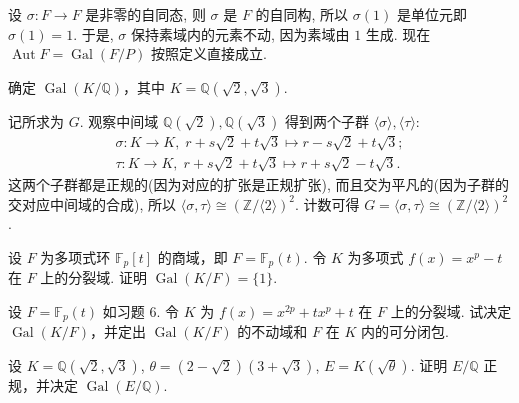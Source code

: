 \begin{solution}
    设 $\sigma\colon F\to F$ 是非零的自同态, 则 $\sigma$ 是 $F$ 的自同构, 
    所以 $\sigma(1)$ 是单位元即 $\sigma(1)=1$. 于是, $\sigma$ 保持素域内的元素不动, 因为素域由 $1$ 生成. 
    现在 $\operatorname{Aut}F=\operatorname{Gal}(F/P)$ 按照定义直接成立. 
\end{solution}

\setcounter{pb}{4}
\begin{problem}
    确定 $ \operatorname{Gal}(K/\mathbb{Q}) $，其中 $ K = \mathbb{Q}(\sqrt{2}, \sqrt{3}) $.
\end{problem}

\begin{solution}
    记所求为 $G$. 观察中间域 $\mathbb{Q}(\sqrt{2}),\mathbb{Q}(\sqrt{3})$ 得到两个子群 $\langle  \sigma \rangle, \langle \tau \rangle  $:
    \[
        \begin{split}
            \sigma\colon  K\to K,\; r+s\sqrt{2}+t\sqrt{3}\mapsto r-s\sqrt{2}+t\sqrt{3};\\
            \tau\colon  K\to K,\; r+s\sqrt{2}+t\sqrt{3}\mapsto r+s\sqrt{2}-t\sqrt{3}.
        \end{split}
    \]
    这两个子群都是正规的(因为对应的扩张是正规扩张), 而且交为平凡的(因为子群的交对应中间域的合成), 所以 $\langle \sigma,\tau \rangle \cong (\mathbb{Z}/\langle 2 \rangle)^{2} $. 
    计数可得 $G=\langle \sigma,\tau \rangle \cong (\mathbb{Z}/\langle 2 \rangle)^{2}$.
\end{solution}

\setcounter{pb}{6}
\begin{problem}
    设 $ F $ 为多项式环 $ \mathbb{F}_p[t] $ 的商域，即 $ F = \mathbb{F}_p(t) $. 
    令 $ K $ 为多项式 $ f(x) = x^p - t $ 在 $ F $ 上的分裂域. 
    证明 $ \operatorname{Gal}(K/F) = \{1\} $.
\end{problem}

\begin{problem}
    设 $ F = \mathbb{F}_p(t) $ 如习题 6. 
    令 $ K $ 为 $ f(x) = x^{2p} + t x^p + t $ 在 $ F $ 上的分裂域. 
    试决定 $ \operatorname{Gal}(K/F) $，并定出 $ \operatorname{Gal}(K/F) $ 的不动域和 $ F $ 在 $ K $ 内的可分闭包. 
\end{problem}

\setcounter{pb}{14}
\begin{problem}
    设 $ K = \mathbb{Q}(\sqrt{2}, \sqrt{3}) $, $ \theta = (2 - \sqrt{2})(3 + \sqrt{3}) $, $ E = K(\sqrt{\theta}) $.
    证明 $ E/\mathbb{Q} $ 正规，并决定 $ \operatorname{Gal}(E/\mathbb{Q}) $.
\end{problem}


